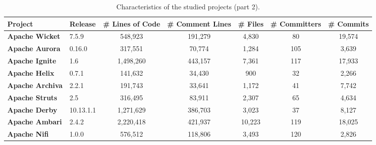 \begin{landscape}

	
	
	\begin{table}[htbp]
		\small
		\centering
		\caption{Characteristics of the studied projects (part 2).}
		\begin{adjustbox}{width=1.3\textwidth}
			
			
			\begin{tabular}{l|l|c|c|c|c|c}
				\hline
				\textbf{Project}           & \textbf{Release} & \textbf{\# Lines of Code} & \textbf{\# Comment Lines} & \textbf{\# Files} & \textbf{\# Committers} & \textbf{\# Commits} \\ \hline
				\textbf{Apache Wicket}     & 7.5.9            & 548,923                    &          191,279           &       4,830        &           80           &        19,574        \\ \hline
				\textbf{Apache Aurora}     & 0.16.0           & 317,551                    &           70,774           &       1,284        &          105           &        3,639         \\ \hline
				\textbf{Apache Ignite}     & 1.6              & 1,498,260                   &          443,157           &       7,361        &          117           &        17,933        \\ \hline
				\textbf{Apache Helix}      & 0.7.1            & 141,632                    &           34,430           &        900        &           32           &        2,266         \\ \hline
				\textbf{Apache Archiva}    & 2.2.1            & 191,743                    &           33,641           &       1,172        &           41           &        7,742         \\ \hline
				\textbf{Apache Struts}     & 2.5              & 316,495                    &           83,911           &       2,307        &           65           &        4,634         \\ \hline
				\textbf{Apache Derby}      & 10.13.1.1        & 1,271,629                   &          386,703           &       3,023        &           37           &        8,127         \\ \hline
				\textbf{Apache Ambari}     & ‎2.4.2           & 2,220,418                   &          421,937           &       10,223       &          119           &        18,025        \\ \hline
				\textbf{Apache Nifi}       & 1.0.0            & 576,512                    &          118,806           &       3,493        &          120           &        2,826         \\ \hline

\end{tabular}
\end{adjustbox}
\end{table}
\end{landscape}

